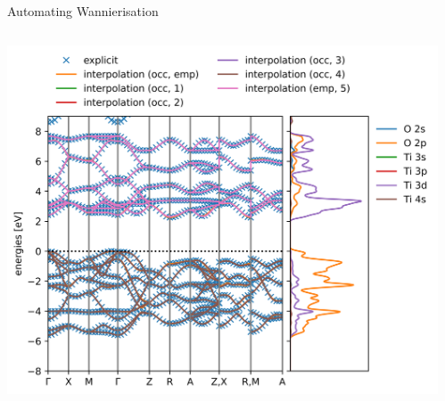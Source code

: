 \documentclass[xcolor=table,aspectratio=169]{beamer}
\numberwithin{equation}{section}
\begin{document}
\begin{frame}{Automating Wannierisation}
   \vspace{-2ex}
   \begin{columns}
      \begin{column}{0.5\textwidth}
         \includegraphics[width=\columnwidth]{figures/TiO2_wannierize_bandstructure.png}
      \end{column}
      \begin{column}{0.5\textwidth}
      \end{column}
   \end{columns}
\end{frame}
\end{document}
